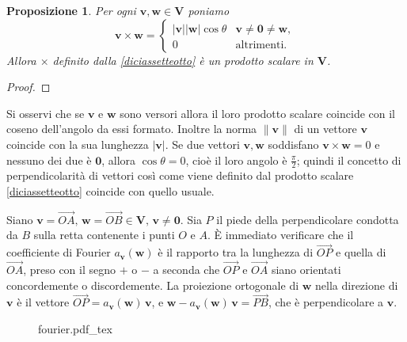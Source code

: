\documentclass{article}
\theoremstyle{plain}
\newtheorem{prop}[thm]{Proposizione}
\theoremstyle{definition}
\theoremstyle{remark}
\newcommand{\incfig}[2][\columnwidth]{%
    \def\svgwidth{#1}
    {#2.pdf_tex}
}
\begin{document}
\vspace{10pt}

\begin{bxthm}
\begin{prop}
Per ogni $\mathbf{v}, \mathbf{w} \in \mathbf{V}$ poniamo
\begin{equation}\label{diciassetteotto}
\mathbf{v} \times \mathbf{w} =
\begin{cases}
|\mathbf{v}| |\mathbf{w}| \cos \theta &  \mathbf{v} \neq \mathbf{0} \neq \mathbf{w},\\
0 & \text{altrimenti}.
\end{cases}    
\end{equation}
Allora $\times$ definito dalla \ref{diciassetteotto} è un prodotto scalare in $\mathbf{V}$.    
\end{prop}
\end{bxthm}
\begin{proof}
    
\end{proof}

\vspace{10pt}

Si osservi che se $\mathbf{v}$ e $\mathbf{w}$ sono versori allora il loro prodotto scalare coincide con il 
coseno dell'angolo da essi formato. Inoltre la norma $\|\mathbf{v}\|$ di un vettore $\mathbf{v}$ coincide 
con la sua lunghezza $|\mathbf{v}|$. Se due vettori $\mathbf{v}, \mathbf{w}$ soddisfano 
$\mathbf{v} \times \mathbf{w} = 0$ e nessuno dei due è $\mathbf{0}$, allora $\cos \theta = 0$, cioè il loro 
angolo è $\frac{\pi}{2}$; quindi il concetto di perpendicolarità di vettori così come viene definito dal 
prodotto scalare \ref{diciassetteotto} coincide con quello usuale.

\vspace{10pt}
 
Siano $\mathbf{v} = \overrightarrow{OA},\,\mathbf{w} = \overrightarrow{OB} \in \mathbf{V},\,\mathbf{v} \neq \mathbf{0}$. 
Sia $P$ il piede della perpendicolare condotta da $B$ sulla retta contenente i punti $O$ e $A$. È 
immediato verificare che il coefficiente di Fourier $a_{\mathbf{v}}(\mathbf{w})$ è il rapporto tra la lunghezza 
di $\overrightarrow{OP}$ e quella di $\overrightarrow{OA}$, preso con il segno $+$ o $-$ a seconda che $\overrightarrow{OP}$ e 
$\overrightarrow{OA}$ siano orientati concordemente o discordemente. La proiezione ortogonale di $\mathbf{w}$ 
nella direzione di $\mathbf{v}$ è il vettore 
$\overrightarrow{OP} = a_{\mathbf{v}}(\mathbf{w}) \, \mathbf{v}$, e $\mathbf{w} - a_{\mathbf{v}}(\mathbf{w}) \, \mathbf{v} = \overrightarrow{PB}$, 
che è perpendicolare a $\mathbf{v}$.
\begin{figure}[H]
    \centering
    \incfig[0.8\linewidth]{fourier}
\end{figure}
\end{document}
